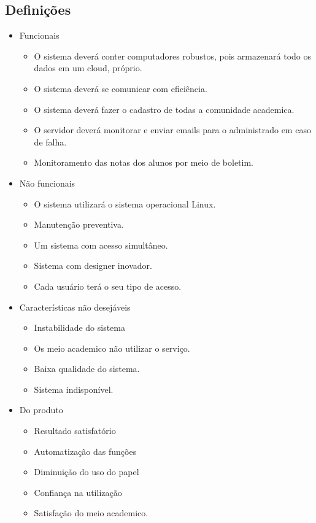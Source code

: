      \subsection{Definições}
       \begin{itemize}
        \item Funcionais
           \begin{itemize}
            \item O sistema deverá conter computadores robustos, pois armazenará todo os dados em um cloud, próprio.
            \item O sistema deverá se comunicar com eficiência.
            \item O sistema deverá fazer o cadastro de todas a comunidade academica.
            \item O servidor deverá monitorar e enviar emails para o administrado em caso de falha.
	    \item Monitoramento das notas dos alunos por meio de boletim.
           \end{itemize}
           
         \item Não funcionais
           \begin{itemize}
            \item O sistema utilizará o sistema operacional Linux.
            \item Manutenção preventiva.
            \item Um sistema com acesso simultâneo.
            \item Sistema com designer inovador.
            \item Cada usuário terá o seu tipo de acesso.
           \end{itemize}

        \item Características não desejáveis
	 \begin{itemize}
	  \item Instabilidade do sistema
	  \item Os meio academico não utilizar o serviço.
	  \item Baixa qualidade do sistema.
	  \item Sistema indisponível.
	 \end{itemize}
	 
	 \item Do produto
	 \begin{itemize}
	  \item Resultado satisfatório
	  \item Automatização das funções
	  \item Diminuição do uso do papel
	  \item Confiança na utilização
	  \item Satisfação do meio academico.
	 \end{itemize} 
	 

\end{itemize}
